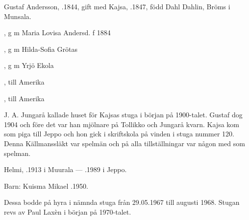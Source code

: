 %
Gustaf Andersson, .1844, gift med Kajsa, .1847, född Dahl Dahlin, Bröms i Munsala.
\begin{jhchildren}
  \item {}, g m Maria Lovisa Andersd. f 1884
  \item {}, g m Hilda-Sofia Grötas
  \item {}, g m Yrjö Ekola
  \item {}
  \item {}, till Amerika
  \item {}, till Amerika
  \item {}
\end{jhchildren}
J. A. Jungarå kallade huset för Kajsas stuga i början på 1900-talet. Gustaf dog 1904 och före det var han mjölnare på Tollikko och Jungarå kvarn. Kajsa kom som piga till Jeppo och hon gick i skriftskola på vinden i stuga nummer 120. Denna Källmanssläkt var spelmän och på alla tillställningar var någon med som spelman.



%


%
Helmi, .1913 i Muurala  ---  .1989 i Jeppo.

Barn: Kuisma Mikael .1950.

Dessa bodde på hyra i nämnda stuga från 29.05.1967 till augusti 1968. Stugan revs av Paul Laxèn i början på 1970-talet.



